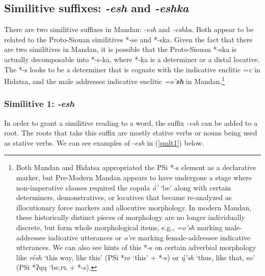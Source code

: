 \subsection{Similitive suffixes: \textit{-esh} and \textit{-eshka}}\label{suffixsimilitive1}

There are two similitive suffixes in Mandan: \textit{-esh} and \textit{-eshka}. Both appear to be related to the Proto-Siouan similitives *-se and *-ska. Given the fact that there are two similitives in Mandan, it is possible that the Proto-Siouan *-ska is actually decomposable into *-s-ka, where *-ka is a determiner or a distal locative. The *-s looks to be a determiner that is cognate with the indicative enclitic =\textit{c} in Hidatsa, and the male addressee indicative enclitic \textit{=o'\textbf{sh}} in Mandan.\footnote{Both Mandan and Hidatsa appropriated the PSi *-s element as a declarative marker, but Pre-Modern Mandan appears to have undergone a stage where non-imperative clauses required the copula \textit{ó'} `be' along with certain determiners, demonstratives, or locatives that became re-analyzed as illocutionary force markers and allocutive morphology. In modern Mandan, these historically distinct pieces of morphology are no longer individually discrete, but form whole morphological items, e.g., \textit{=o'sh} marking male-addressee indicative utterances or \textit{o're} marking female-addressee indicative utterances. We can also see hints of this *-s on certain adverbial morphology like \textit{résh} `this way, like this' (PSi *re `this' + *-s) or \textit{ų́'sh} `thus, like that, so' (PSi *ʔųų `be.\textsc{pl} + *-s).} 

\subsubsection{Similitive 1: \textit{-esh}}

In order to grant a similitive reading to a word, the suffix \textit{-esh} can be added to a root. The roots that take this suffix are mostly stative verbs or nouns being used as stative verbs. We can see examples of -\textit{esh} in (\ref{smlt1}) below.

